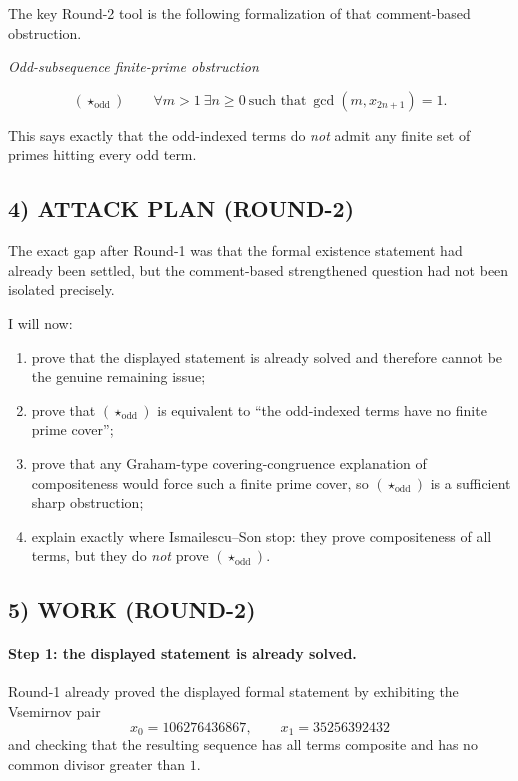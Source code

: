The key Round-2 tool is the following formalization of that comment-based obstruction.

\medskip
\centerline{\emph{Odd-subsequence finite-prime obstruction}}
\[
(\star_{\mathrm{odd}})\qquad
\forall m>1\ \exists n\ge 0\ \mbox{such that}\ \gcd(m,x_{2n+1})=1.
\]

This says exactly that the odd-indexed terms do \emph{not} admit any finite set of primes hitting every odd term.

\subsection*{4) ATTACK PLAN (ROUND-2)}

The exact gap after Round-1 was that the formal existence statement had already been settled, but the comment-based strengthened question had not been isolated precisely.

I will now:

\begin{enumerate}
\item prove that the displayed statement is already solved and therefore cannot be the genuine remaining issue;
\item prove that $(\star_{\mathrm{odd}})$ is equivalent to ``the odd-indexed terms have no finite prime cover'';
\item prove that any Graham-type covering-congruence explanation of compositeness would force such a finite prime cover, so $(\star_{\mathrm{odd}})$ is a sufficient sharp obstruction;
\item explain exactly where Ismailescu--Son stop: they prove compositeness of all terms, but they do \emph{not} prove $(\star_{\mathrm{odd}})$.
\end{enumerate}

\subsection*{5) WORK (ROUND-2)}

\paragraph{Step 1: the displayed statement is already solved.}
Round-1 already proved the displayed formal statement by exhibiting the Vsemirnov pair
\[
x_0=106276436867,\qquad x_1=35256392432
\]
and checking that the resulting sequence has all terms composite and has no common divisor greater than $1$.

